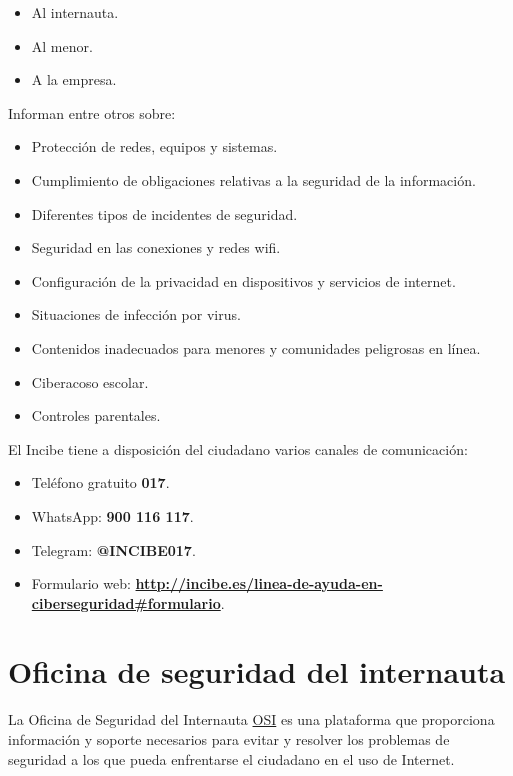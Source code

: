 \documentclass[
  spanish,
  a4paper,
  openany]{book}
\begin{document}
\begin{itemize}
\item
  Al internauta.
\item
  Al menor.
\item
  A la empresa.
\end{itemize}

Informan entre otros sobre:

\begin{itemize}
\item
  Protección de redes, equipos y sistemas.
\item
  Cumplimiento de obligaciones relativas a la seguridad de la información.
\item
  Diferentes tipos de incidentes de seguridad.
\item
  Seguridad en las conexiones y redes wifi.
\item
  Configuración de la privacidad en dispositivos y servicios de internet.
\item
  Situaciones de infección por virus.
\item
  Contenidos inadecuados para menores y comunidades peligrosas en línea.
\item
  Ciberacoso escolar.
\item
  Controles parentales.
\end{itemize}

El Incibe tiene a disposición del ciudadano varios canales de comunicación:

\begin{itemize}
\item
  Teléfono gratuito \textbf{017}.
\item
  WhatsApp: \textbf{900 116 117}.
\item
  Telegram: \textbf{@INCIBE017}.
\item
  Formulario web: \textbf{\url{http://incibe.es/linea-de-ayuda-en-ciberseguridad\#formulario}}.
\end{itemize}

\hypertarget{oficina-de-seguridad-del-internauta}{%
\section{Oficina de seguridad del internauta}\label{oficina-de-seguridad-del-internauta}}

La Oficina de Seguridad del Internauta \href{https://www.osi.es/}{OSI} es una plataforma que proporciona información y soporte necesarios para evitar y resolver los problemas de seguridad a los que pueda enfrentarse el ciudadano en el uso de Internet.
\end{document}
